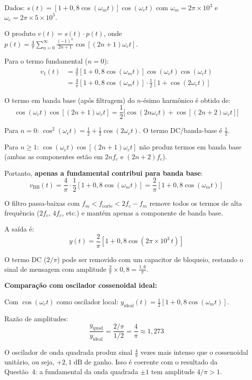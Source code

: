 \documentclass[11pt,a4paper]{article}
\begin{document}
\begin{resolucao}

Dados: $s(t) = [1 + 0{,}8\cos(\omega_m t)]\cos(\omega_c t)$ com $\omega_m = 2\pi \times 10^3$ e $\omega_c = 2\pi \times 5 \times 10^5$.

O produto $v(t) = s(t) \cdot p(t)$, onde $p(t) = \frac{4}{\pi}\sum_{n=0}^{\infty}\frac{(-1)^n}{2n+1}\cos[(2n+1)\omega_c t]$.

Para o termo fundamental ($n = 0$):
\begin{align*}
  v_1(t) &= \frac{4}{\pi}[1 + 0{,}8\cos(\omega_m t)]\cos(\omega_c t)\cos(\omega_c t) \\
  &= \frac{4}{\pi}[1 + 0{,}8\cos(\omega_m t)] \cdot \frac{1}{2}[1 + \cos(2\omega_c t)]
\end{align*}

O termo em banda base (após filtragem) do $n$-ésimo harmônico é obtido de:
\[
  \cos(\omega_c t)\cos[(2n+1)\omega_c t] = \frac{1}{2}\big[\cos(2n\omega_c t) + \cos[(2n+2)\omega_c t]\big]
\]

Para $n = 0$: $\cos^2(\omega_c t) = \frac{1}{2} + \frac{1}{2}\cos(2\omega_c t)$. O termo DC/banda-base é $\frac{1}{2}$.

Para $n \geq 1$: $\cos(\omega_c t)\cos[(2n+1)\omega_c t]$ não produz termos em banda base (ambas as componentes estão em $2nf_c$ e $(2n+2)f_c$).

Portanto, \textbf{apenas a fundamental contribui para banda base}:
\[
  v_{\text{BB}}(t) = \frac{4}{\pi} \cdot \frac{1}{2}[1 + 0{,}8\cos(\omega_m t)] = \frac{2}{\pi}[1 + 0{,}8\cos(\omega_m t)]
\]
\end{resolucao}

\begin{resolucao}

O filtro passa-baixas com $f_m < f_{\text{corte}} < 2f_c - f_m$ remove todos os termos de alta frequência ($2f_c$, $4f_c$, etc.) e mantém apenas a componente de banda base.

A saída é:
\[
  \boxed{y(t) = \frac{2}{\pi}[1 + 0{,}8\cos(2\pi \times 10^3\,t)]}
\]

O termo DC ($2/\pi$) pode ser removido com um capacitor de bloqueio, restando o sinal de mensagem com amplitude $\frac{2}{\pi} \times 0{,}8 = \frac{1{,}6}{\pi}$.

\textbf{Comparação com oscilador cossenoidal ideal:}

Com $\cos(\omega_c t)$ como oscilador local: $y_{\text{ideal}}(t) = \frac{1}{2}[1 + 0{,}8\cos(\omega_m t)]$.

Razão de amplitudes:
\[
  \frac{y_{\text{quad}}}{y_{\text{ideal}}} = \frac{2/\pi}{1/2} = \frac{4}{\pi} \approx 1{,}273
\]

O oscilador de onda quadrada produz sinal $\frac{4}{\pi}$ vezes mais intenso que o cossenoidal unitário, ou seja, $\boxed{+2{,}1\;\text{dB}}$ de ganho. Isso é coerente com o resultado da Questão~4: a fundamental da onda quadrada $\pm 1$ tem amplitude $4/\pi > 1$.
\end{resolucao}
\end{document}
